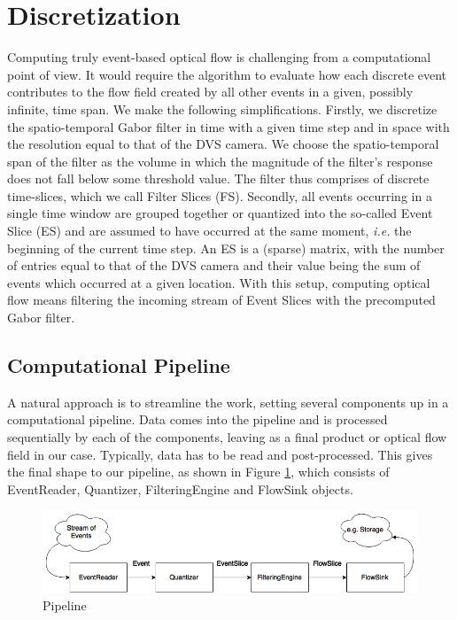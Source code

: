\section{Discretization}

Computing truly event-based optical flow is challenging from a computational point of view. 
It would require the algorithm to evaluate how each discrete event contributes to the flow field created by all other events in a given, possibly infinite, time span.
We make the following simplifications.
Firstly, we discretize the spatio-temporal Gabor filter in time with a given time step and in space with the resolution equal to that of the DVS camera.
We choose the spatio-temporal span of the filter as the volume in which the magnitude of the filter's response does not fall below some threshold value.
The filter thus comprises of discrete time-slices, which we call Filter Slices (FS).
Secondly, all events occurring in a single time window are grouped together or quantized into the so-called Event Slice (ES) and are assumed to have occurred at the same moment, \emph{i.e.} the beginning of the current time step. 
An ES is a (sparse) matrix, with the number of entries equal to that of the DVS camera and their value being the sum of events which occurred at a given location. 
With this setup, computing optical flow means filtering the incoming stream of Event Slices with the precomputed Gabor filter.


\subsection{Computational Pipeline}
A natural approach is to streamline the work, setting several components up in a computational pipeline.
Data comes into the pipeline and is processed sequentially by each of the components, leaving as a final product or optical flow field in our case. 
Typically, data has to be read and post-processed.
This gives the final shape to our pipeline, as shown in Figure \ref{fig:pipeline}, which consists of EventReader, Quantizer, FilteringEngine and FlowSink objects.

\begin{figure}[ht!]
 \label{fig:pipeline}
 \includegraphics[width=\textwidth]{figs/pipeline}
 \caption{Pipeline}
\end{figure}

